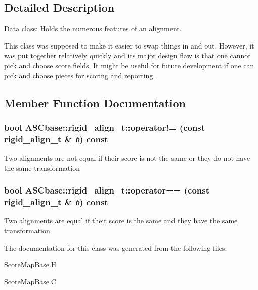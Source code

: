 \subsection{Detailed Description}
Data class: Holds the numerous features of an alignment. 

This class was supposed to make it easier to swap things in and out. However, it was put together relatively quickly and its major design flaw is that one cannot pick and choose score fields. It might be useful for future development if one can pick and choose pieces for scoring and reporting. 



\subsection{Member Function Documentation}
\subsubsection{\setlength{\rightskip}{0pt plus 5cm}bool ASCbase::rigid\_\-align\_\-t::operator!= (const \bf{rigid\_\-align\_\-t} \& {\em b}) const\hspace{0.3cm}{\tt  [inline]}}\label{classASCbase_1_1rigid__align__t_dd0fdb2785fd9d00e710d9afd3253f4a}


Two alignments are not equal if their score is not the same or they do not have the same transformation 
\subsubsection{\setlength{\rightskip}{0pt plus 5cm}bool ASCbase::rigid\_\-align\_\-t::operator== (const \bf{rigid\_\-align\_\-t} \& {\em b}) const\hspace{0.3cm}{\tt  [inline]}}\label{classASCbase_1_1rigid__align__t_3f01290c1017cdf9f9e1e6a3bf7af5ac}


Two alignments are equal if their score is the same and they have the same transformation 

The documentation for this class was generated from the following files:\begin{CompactItemize}
\item 
Score\-Map\-Base.H\item 
Score\-Map\-Base.C\end{CompactItemize}
